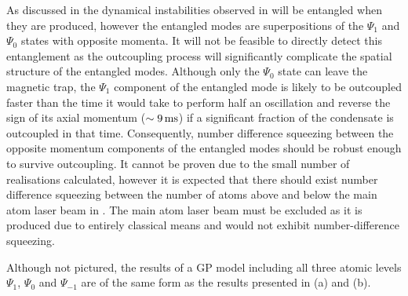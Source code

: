 As discussed in  the dynamical instabilities observed in  will be entangled when they are produced, however the entangled modes are superpositions of the $\Psi_1$ and $\Psi_0$ states with opposite momenta.  It will not be feasible to directly detect this entanglement as the outcoupling process will significantly complicate the spatial structure of the entangled modes.  Although only the $\Psi_0$ state can leave the magnetic trap, the $\Psi_1$ component of the entangled mode is likely to be outcoupled faster than the time it would take to perform half an oscillation and reverse the sign of its axial momentum ($\sim \unit[9]{ms}$) if a significant fraction of the condensate is outcoupled in that time.  Consequently, number difference squeezing between the opposite momentum components of the entangled modes should be robust enough to survive outcoupling.  It cannot be proven due to the small number of realisations calculated, however it is expected that there should exist number difference squeezing between the number of atoms above and below the main atom laser beam in .  The main atom laser beam must be excluded as it is produced due to entirely classical means and would not exhibit number-difference squeezing.

Although not pictured, the results of a GP model including all three atomic levels $\Psi_1$, $\Psi_0$ and $\Psi_{-1}$ are of the same form as the results presented in (a) and (b).




% 




